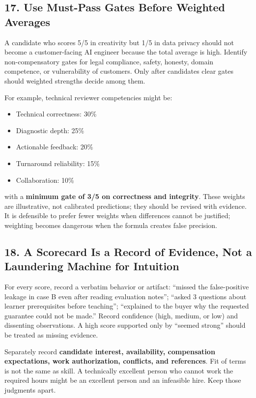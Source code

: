 \subsection*{17. Use Must-Pass Gates Before Weighted Averages}

A candidate who scores 5/5 in creativity but 1/5 in data privacy should not become a customer-facing AI engineer because the total average is high. Identify non-compensatory gates for legal compliance, safety, honesty, domain competence, or vulnerability of customers. Only after candidates clear gates should weighted strengths decide among them.

For example, technical reviewer competencies might be:
\begin{itemize}[leftmargin=*]
\item Technical correctness: 30\%
\item Diagnostic depth: 25\%
\item Actionable feedback: 20\%
\item Turnaround reliability: 15\%
\item Collaboration: 10\%
\end{itemize}
with a \textbf{minimum gate of 3/5 on correctness and integrity}. These weights are illustrative, not calibrated predictions; they should be revised with evidence. It is defensible to prefer fewer weights when differences cannot be justified; weighting becomes dangerous when the formula creates false precision.

\subsection*{18. A Scorecard Is a Record of Evidence, Not a Laundering Machine for Intuition}

For every score, record a verbatim behavior or artifact: ``missed the false-positive leakage in case B even after reading evaluation notes''; ``asked 3 questions about learner prerequisites before teaching''; ``explained to the buyer why the requested guarantee could not be made.'' Record confidence (high, medium, or low) and dissenting observations. A high score supported only by ``seemed strong'' should be treated as missing evidence.

Separately record \textbf{candidate interest, availability, compensation expectations, work authorization, conflicts, and references}. Fit of terms is not the same as skill. A technically excellent person who cannot work the required hours might be an excellent person and an infeasible hire. Keep those judgments apart.

